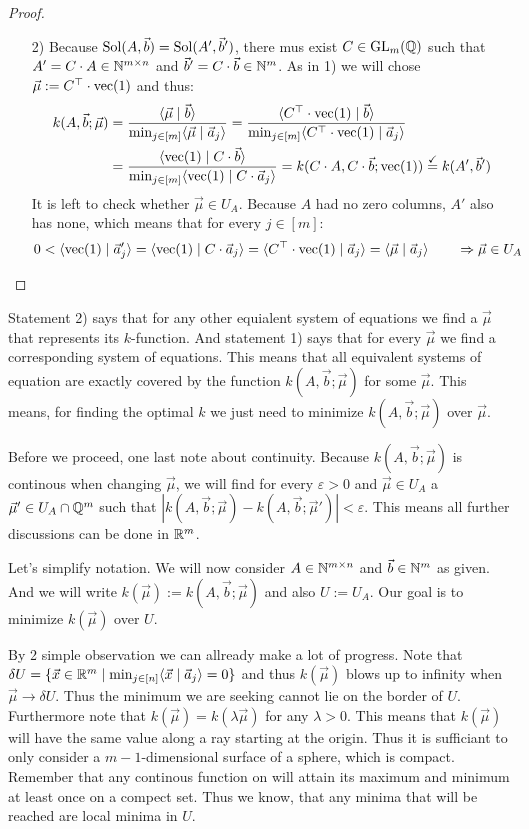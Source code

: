 \begin{proof}
\begin{enumerate}
        \item[2)] Because $\operatorname{Sol}(A, \vec b) = \operatorname{Sol}(A', \vec b')$, there mus exist $C \in \operatorname{GL}_m(\mathbb{Q})$ such that $A' = C \cdot A \in \mathbb{N}^{m \times n}$ and $\vec b' = C \cdot \vec b \in \mathbb{N}^m$. As in 1) we will chose $\vec \mu := C^\top \cdot \operatorname{vec}(1)$ and thus:
        \begin{align*}
            k(A, \vec b; \vec\mu) &= \frac{\langle \vec\mu \mid \vec b \rangle}{\min_{j\in [m]}\langle \vec\mu \mid \vec a_j \rangle} = \frac{\langle C^\top\cdot\operatorname{vec}(1) \mid \vec b \rangle}{\min_{j\in [m]}\langle C^\top\cdot\operatorname{vec}(1) \mid \vec a_j \rangle}\\
            &= \frac{\langle \operatorname{vec}(1) \mid C\cdot\vec b \rangle}{\min_{j\in [m]}\langle \operatorname{vec}(1) \mid C\cdot\vec a_j \rangle} = k(C\cdot A, C\cdot\vec b; \operatorname{vec}(1)) \stackrel{\checkmark}{=} k(A', \vec b')
        \end{align*}
        It is left to check whether $\vec \mu \in U_A$. Because $A$ had no zero columns, $A'$ also has none, which means that for every $j \in [m]$:
        $$0 < \langle \operatorname{vec}(1) \mid \vec a'_j \rangle = \langle \operatorname{vec}(1) \mid C \cdot \vec a_j \rangle = \langle C^\top \cdot \operatorname{vec}(1) \mid \vec a_j \rangle = \langle \vec \mu \mid \vec a_j \rangle \qquad \Rightarrow\vec \mu \in U_A$$

    \end{enumerate}
\end{proof}

Statement 2) says that for any other equialent system of equations we find a $\vec \mu$ that represents its $k$-function. And statement 1) says that for every $\vec \mu$ we find a corresponding system of equations. This means that all equivalent systems of equation are exactly covered by the function $k(A, \vec b; \vec\mu)$ for some $\vec \mu$. This means, for finding the optimal $k$ we just need to minimize $k(A, \vec b; \vec \mu)$ over $\vec \mu$.

Before we proceed, one last note about continuity. Because $k(A, \vec b; \vec \mu)$ is continous when changing $\vec\mu$, we will find for every $\varepsilon > 0$ and $\vec\mu \in U_A$ a $\vec\mu' \in U_A \cap \mathbb{Q}^m$ such that $|k(A, \vec b; \vec \mu) - k(A, \vec b; \vec \mu')| < \varepsilon$. This means all further discussions can be done in $\mathbb{R}^m$.

Let's simplify notation. We will now consider $A \in \mathbb{N}^{m \times n}$ and $\vec b \in \mathbb{N}^m$ as given. And we will write $k(\vec \mu) := k(A, \vec b; \vec \mu)$ and also $U := U_A$. Our goal is to minimize $k(\vec \mu)$ over $U$.

By 2 simple observation we can allready make a lot of progress. Note that $\delta U = \{\vec x \in \mathbb{R}^m \mid \min_{j \in [n]}\langle \vec x \mid \vec a_j \rangle = 0\}$ and thus $k(\vec \mu)$ blows up to infinity when $\vec \mu \to \delta U$. Thus the minimum we are seeking cannot lie on the border of $U$. Furthermore note that $k(\vec \mu) = k(\lambda \vec\mu)$ for any $\lambda > 0$. This means that $k(\vec \mu)$ will have the same value along a ray starting at the origin. Thus it is sufficiant to only consider a $m-1$-dimensional surface of a sphere, which is compact. Remember that any continous function on will attain its maximum and minimum at least once on a compect set. Thus we know, that any minima that will be reached are local minima in $U$.

